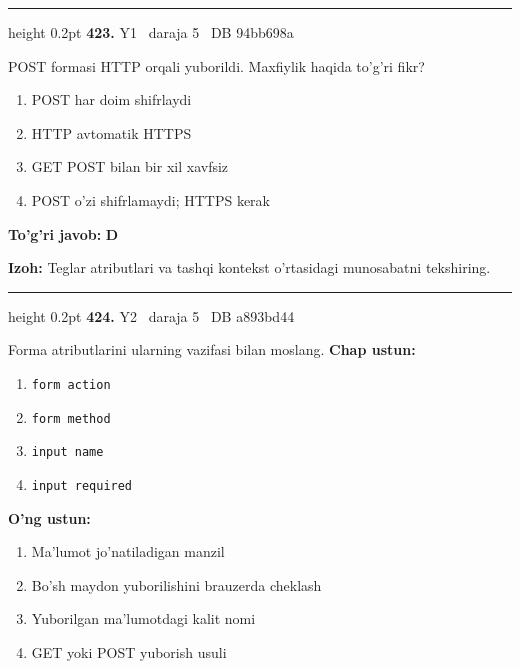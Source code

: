 \documentclass[10pt,a4paper,oneside]{article}
\begin{document}
\vspace{2mm}\hrule height 0.2pt \vspace{4mm}
\hypertarget{q423}{\textbf{\color{ink}423.}}  {\color{muted}\scriptsize Y1 \textbullet\ daraja 5 \textbullet\ DB 94bb698a}
\par
POST formasi HTTP orqali yuborildi. Maxfiylik haqida to'g'ri fikr?
\begin{enumerate}[label=\Alph*),leftmargin=9mm]
\item POST har doim shifrlaydi
\item HTTP avtomatik HTTPS
\item GET POST bilan bir xil xavfsiz
\item POST o'zi shifrlamaydi; HTTPS kerak
\end{enumerate}
\begin{tcolorbox}[enhanced,breakable,colback=teal!4,colframe=teal!45!black,boxrule=0.45pt,arc=1.2mm,left=2.8mm,right=2.8mm,top=2mm,bottom=2mm,before skip=2mm,after skip=2mm]
\textbf{\color{teal}To'g'ri javob:} \textbf{D}
\par\smallskip
\textbf{Izoh:} Teglar atributlari va tashqi kontekst o'rtasidagi munosabatni tekshiring.
\end{tcolorbox}
\vspace{2mm}\hrule height 0.2pt \vspace{4mm}
\hypertarget{q424}{\textbf{\color{ink}424.}}  {\color{muted}\scriptsize Y2 \textbullet\ daraja 5 \textbullet\ DB a893bd44}
\par
Forma atributlarini ularning vazifasi bilan moslang.
\textbf{\footnotesize Chap ustun:}
\begin{enumerate}[label=\arabic*),leftmargin=9mm]
\item \texttt{form action}
\item \texttt{form method}
\item \texttt{input name}
\item \texttt{input required}
\end{enumerate}
\textbf{\footnotesize O'ng ustun:}
\begin{enumerate}[label=\Alph*),leftmargin=9mm]
\item Ma'lumot jo'natiladigan manzil
\item Bo'sh maydon yuborilishini brauzerda cheklash
\item Yuborilgan ma'lumotdagi kalit nomi
\item GET yoki POST yuborish usuli
\end{enumerate}
\end{document}

